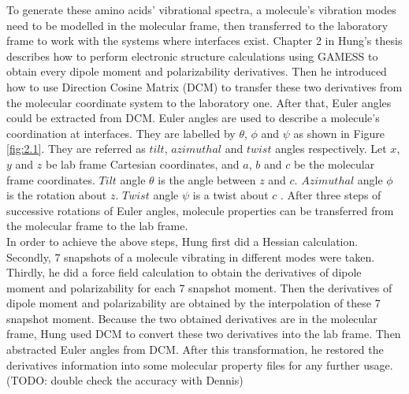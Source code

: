 To generate these amino acids' vibrational spectra, a molecule's vibration modes need to be modelled in the molecular frame, then transferred to the laboratory frame to work with the systems where interfaces exist. Chapter 2 in Hung's thesis \cite{KuoKaiHung:Thesis:2015} describes how to perform electronic structure calculations using GAMESS \cite{GAMESS} to obtain every dipole moment and polarizability derivatives. Then he introduced how to use Direction Cosine Matrix (DCM) to transfer these two derivatives from the molecular coordinate system to the laboratory one. After that, Euler angles could be extracted from DCM. Euler angles are used to describe a molecule's coordination at interfaces. They are labelled by $\theta$, $\phi$ and $\psi$ as shown in Figure \ref{fig:2.1}. They are referred as $tilt$, $azimuthal$ and $twist$ angles respectively. Let $x$, $y$ and $z$ be lab frame Cartesian coordinates, and $a$, $b$ and $c$ be the molecular frame coordinates. $Tilt$ angle $\theta$ is the angle between $z$ and $c$. $Azimuthal$ angle $\phi$ is the rotation about $z$. $Twist$ angle $\psi$ is a twist about $c$ \cite{hore0033-rotations}. After three steps of successive rotations of Euler angles, molecule properties can be transferred from the molecular frame to the lab frame. \\

In order to achieve the above steps, Hung first did a Hessian calculation. Secondly, 7 snapshots of a molecule vibrating in different modes were taken. Thirdly, he did a force field calculation to obtain the derivatives of dipole moment and polarizability for each 7 snapshot moment. Then the derivatives of dipole moment and polarizability are obtained by the interpolation of these 7 snapshot moment. Because the two obtained derivatives are in the molecular frame, Hung used DCM to convert these two derivatives into the lab frame. Then abstracted Euler angles from DCM. After this transformation, he restored the derivatives information into some molecular property files for any further usage. (TODO: double check the accuracy with Dennis)\\

